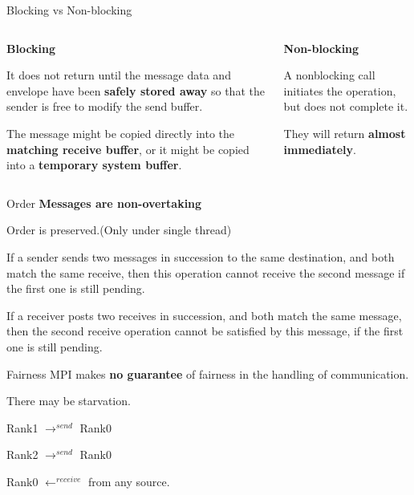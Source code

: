 \begin{frame}{Blocking vs Non-blocking}
    \begin{columns}
        \begin{column}{.5\textwidth}
            \textbf{\large Blocking}

            It does not return until the message data and envelope have been \alert{\textbf{safely stored away}} so that the sender is free to modify the send buffer. 
            
            The message might be copied directly into the \alert{\textbf{matching receive buffer}}, or it might be copied into a \alert{\textbf{temporary system buffer}}.
        \end{column}
        \begin{column}{.5\textwidth}
            \textbf{\large Non-blocking}

            A nonblocking call initiates the operation, but does not complete it. 
            
            They will return \alert{\textbf{almost immediately}}.
            
        \end{column}
    \end{columns}
\end{frame}

\begin{frame}{Order}
    \textbf{\large Messages are non-overtaking}
    
    Order is preserved.(Only under single thread)

If a sender sends two messages in succession to the same destination, and both match the same receive, then this operation cannot receive the second message if the first one is still pending. 

If a receiver posts two receives in succession, and both match the same message, then the second receive operation cannot be satisfied by this message, if the first one is still pending.
\end{frame}

\begin{frame}{Fairness}
    MPI makes \alert{\textbf{no guarantee}} of fairness in the handling of communication.

    There may be starvation.

    \begin{example}
        Rank1 $\rightarrow ^{send}$ Rank0

        Rank2 $\rightarrow^{send}$ Rank0

        Rank0 $\leftarrow^{receive}$ from any source.
    \end{example}
\end{frame}